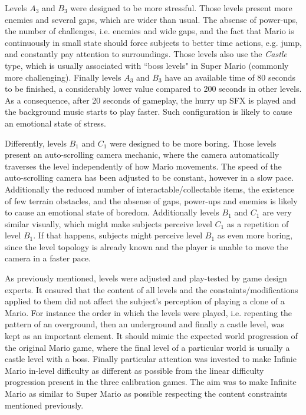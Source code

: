 Levels $A_3$ and $B_3$ were designed to be more stressful. Those levels present more enemies and several gaps, which are wider than usual. The absense of power-ups, the number of challenges, i.e. enemies and wide gaps, and the fact that Mario is continuously in small state should force subjects to better time actions, e.g. jump, and constantly pay attention to surroundings. Those levels also use the \textit{Castle} type, which is usually associated with ``boss levels" in Super Mario (commonly more challenging). Finally levels $A_3$ and $B_3$ have an available time of 80 seconds to be finished, a considerably lower value compared to 200 seconds in other levels. As a consequence, after 20 seconds of gameplay, the hurry up SFX is played and the background music starts to play faster. Such configuration is likely to cause an emotional state of stress.

Differently, levels $B_1$ and $C_1$ were designed to be more boring. Those levels present an auto-scrolling camera mechanic, where the camera automatically traverses the level independently of how Mario movements. The speed of the auto-scrolling camera has been adjusted to be constant, however in a slow pace. Additionally the reduced number of interactable/collectable items, the existence of few terrain obstacles, and the absense of gaps, power-ups and enemies is likely to cause an emotional state of boredom. Additionally levels $B_1$ and $C_1$ are very similar visually, which might make subjects perceive level $C_1$ as a repetition of level $B_1$. If that happens, subjects might perceive level $B_1$ as even more boring, since the level topology is already known and the player is unable to move the camera in a faster pace.

As previously mentioned, levels were adjusted and play-tested by game design experts. It ensured that the content of all levels and the constaints/modifications applied to them did not affect the subject's perception of playing a clone of a Mario. For instance the order in which the levels were played, i.e. repeating the pattern of an overground, then an underground and finally a castle level, was kept as an important element. It should mimic the expected world progression of the original Mario game, where the final level of a particular world is usually a castle level with a boss. Finally particular attention was invested to make Infinie Mario in-level difficulty as different as possible from the linear difficulty progression present in the three calibration games. The aim was to make Infinite Mario as similar to Super Mario as possible respecting the content constraints mentioned previously.

